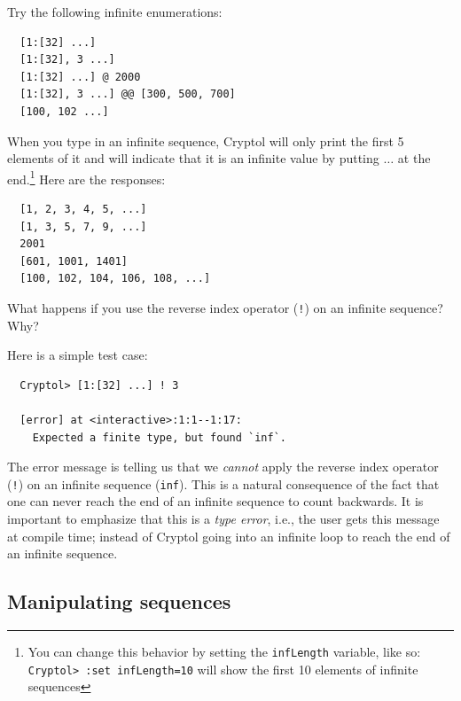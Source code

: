 \begin{Exercise}\label{ex:seq:9}
Try the following infinite enumerations:
\begin{Verbatim}
  [1:[32] ...]
  [1:[32], 3 ...]
  [1:[32] ...] @ 2000
  [1:[32], 3 ...] @@ [300, 500, 700]
  [100, 102 ...]
\end{Verbatim}
\end{Exercise}
\begin{Answer}
  When you type in an infinite sequence, Cryptol will only print the
  first 5 elements of it and will indicate that it is an infinite value
  by putting $\ldots$ at the end.\footnote{You can change this behavior
    by setting the {\tt infLength} variable, like so: {\tt Cryptol>
      :set infLength=10} will show the first 10 elements of infinite
    sequences} Here are the responses:
\begin{Verbatim}
  [1, 2, 3, 4, 5, ...]
  [1, 3, 5, 7, 9, ...]
  2001
  [601, 1001, 1401]
  [100, 102, 104, 106, 108, ...]
\end{Verbatim}
\end{Answer}
\begin{Exercise}\label{ex:seq:10}
  What happens if you use the reverse index operator ({\tt !}) on an
  infinite sequence? Why?
\end{Exercise}
\begin{Answer}
Here is a simple test case:
\begin{Verbatim}
  Cryptol> [1:[32] ...] ! 3

  [error] at <interactive>:1:1--1:17:
    Expected a finite type, but found `inf`.
\end{Verbatim}
The error message is telling us that we \emph{cannot} apply the reverse
index operator ({\tt !}) on an infinite sequence (\texttt{inf}).  This
is a natural consequence of the fact that one can never reach the end
of an infinite sequence to count backwards.  It is important to
emphasize that this is a \emph{type error}, i.e., the user gets this
message at compile time; instead of Cryptol going into an infinite
loop to reach the end of an infinite sequence.
\end{Answer}

\subsection{Manipulating sequences}
\label{sec:manip-sequ}

